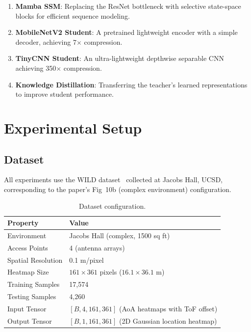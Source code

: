 \documentclass[11pt,a4paper]{article}
\begin{document}
\begin{enumerate}[leftmargin=*]
    \item \textbf{Mamba SSM}: Replacing the ResNet bottleneck with selective state-space blocks for efficient sequence modeling.
    \item \textbf{MobileNetV2 Student}: A pretrained lightweight encoder with a simple decoder, achieving 7$\times$ compression.
    \item \textbf{TinyCNN Student}: An ultra-lightweight depthwise separable CNN achieving 350$\times$ compression.
    \item \textbf{Knowledge Distillation}: Transferring the teacher's learned representations to improve student performance.
\end{enumerate}

\section{Experimental Setup}

\subsection{Dataset}

All experiments use the WILD dataset~\cite{dloc2020} collected at Jacobs Hall, UCSD, corresponding to the paper's Fig~10b (complex environment) configuration.

\begin{table}[H]
\centering
\caption{Dataset configuration.}
\begin{tabular}{ll}
\toprule
\textbf{Property} & \textbf{Value} \\
\midrule
Environment & Jacobs Hall (complex, 1500 sq ft) \\
Access Points & 4 (antenna arrays) \\
Spatial Resolution & 0.1 m/pixel \\
Heatmap Size & $161 \times 361$ pixels ($16.1 \times 36.1$ m) \\
Training Samples & 17,574 \\
Testing Samples & 4,260 \\
Input Tensor & $[B, 4, 161, 361]$ (AoA heatmaps with ToF offset) \\
Output Tensor & $[B, 1, 161, 361]$ (2D Gaussian location heatmap) \\
\bottomrule
\end{tabular}
\end{table}
\end{document}

